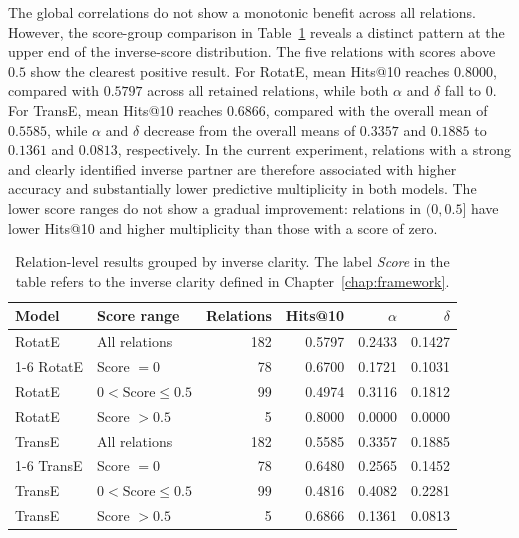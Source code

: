The global correlations do not show a monotonic benefit across all relations.
However, the score-group comparison in
Table~\ref{tab:inverse-score-groups} reveals a distinct pattern at the upper
end of the inverse-score distribution. The five relations with scores above
\(0.5\) show the clearest positive result. For RotatE, mean Hits@10 reaches
\(0.8000\), compared with \(0.5797\) across all retained relations, while both
\(\alpha\) and \(\delta\) fall to \(0\). For TransE, mean Hits@10 reaches
\(0.6866\), compared with the overall mean of \(0.5585\), while \(\alpha\) and
\(\delta\) decrease from the overall means of \(0.3357\) and \(0.1885\) to
\(0.1361\) and \(0.0813\), respectively. In the current experiment, relations
with a strong and clearly identified inverse partner are therefore associated
with higher accuracy and substantially lower predictive multiplicity in both
models. The lower score ranges do not show a gradual improvement: relations in
\((0,0.5]\) have lower Hits@10 and higher multiplicity than those with a score
of zero.

\begin{table}[!t]
    \centering
    \caption{Relation-level results grouped by inverse clarity. The label
    \emph{Score} in the table refers to the inverse clarity defined in
    Chapter~\ref{chap:framework}.}
    \label{tab:inverse-score-groups}
    \small
    \begin{tabular}{llrrrr}
        \toprule
        Model & Score range & Relations & Hits@10 & \(\alpha\) & \(\delta\) \\
        \midrule
        RotatE & All relations & 182 & 0.5797 & 0.2433 & 0.1427 \\
        \cmidrule(lr){1-6}
        RotatE & Score \(=0\) & 78 & 0.6700 & 0.1721 & 0.1031 \\
        RotatE & \(0<\text{Score}\leq 0.5\) & 99 & 0.4974 & 0.3116 & 0.1812 \\
        RotatE & Score \(>0.5\) & 5 & 0.8000 & 0.0000 & 0.0000 \\
        \midrule
        TransE & All relations & 182 & 0.5585 & 0.3357 & 0.1885 \\
        \cmidrule(lr){1-6}
        TransE & Score \(=0\) & 78 & 0.6480 & 0.2565 & 0.1452 \\
        TransE & \(0<\text{Score}\leq 0.5\) & 99 & 0.4816 & 0.4082 & 0.2281 \\
        TransE & Score \(>0.5\) & 5 & 0.6866 & 0.1361 & 0.0813 \\
        \bottomrule
    \end{tabular}
\end{table}

